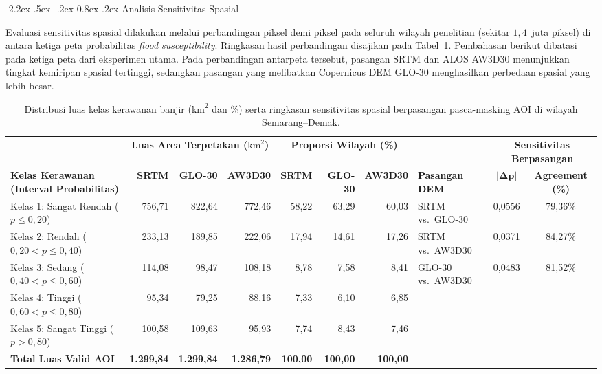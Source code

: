 \documentclass[12pt,a4paper]{article}
\makeatletter
\renewcommand\subsection{\@startsection{subsection}{2}{\z@}%
  {-2.2ex\@plus -.5ex \@minus -.2ex}%
  {0.8ex \@plus .2ex}%
  {\normalfont\normalsize\bfseries}}
\newenvironment{adjustbox}[1]{%
  \begin{lrbox}{\adjboxtemp}%
}{%
  \end{lrbox}%
  \ifdim\wd\adjboxtemp>\textwidth
    \resizebox{\textwidth}{!}{\usebox{\adjboxtemp}}%
  \else
    \usebox{\adjboxtemp}%
  \fi
}
\makeatother
\begin{document}
\subsection{Analisis Sensitivitas Spasial}

Evaluasi sensitivitas spasial dilakukan melalui perbandingan piksel demi
piksel pada seluruh wilayah penelitian (sekitar $1{,}4$~juta piksel) di
antara ketiga peta probabilitas \textit{flood susceptibility}. Ringkasan hasil
perbandingan disajikan pada Tabel~\ref{tab:sensitivitas}. Pembahasan
berikut dibatasi pada ketiga peta dari eksperimen utama. Pada perbandingan
antarpeta tersebut, pasangan SRTM
dan ALOS AW3D30 menunjukkan
tingkat kemiripan spasial tertinggi, sedangkan pasangan yang melibatkan
Copernicus DEM GLO-30 menghasilkan perbedaan spasial yang lebih besar.

\begin{table}[!htbp]
\small
\centering
\caption[Distribusi luas kelas kerawanan banjir dan sensitivitas spasial]{Distribusi luas kelas kerawanan banjir ($\text{km}^2$ dan \%) serta ringkasan sensitivitas spasial berpasangan pasca-masking AOI di wilayah Semarang--Demak.}
\label{tab:sensitivitas}
\begin{adjustbox}{max width=\textwidth}
\begin{tabular}{l rrr rrr l cc}
\toprule
& \multicolumn{3}{c}{\textbf{Luas Area Terpetakan ($\text{km}^2$)}} & \multicolumn{3}{c}{\textbf{Proporsi Wilayah (\%)}} & & \multicolumn{2}{c}{\textbf{Sensitivitas Berpasangan}} \\
\cmidrule(lr){2-4} \cmidrule(lr){5-7} \cmidrule(lr){9-10}
\textbf{Kelas Kerawanan (Interval Probabilitas)} & \textbf{SRTM} & \textbf{GLO-30} & \textbf{AW3D30} & \textbf{SRTM} & \textbf{GLO-30} & \textbf{AW3D30} & \textbf{Pasangan DEM} & $\boldsymbol{\overline{|\Delta p|}}$ & \textbf{Agreement (\%)} \\
\midrule
Kelas 1: Sangat Rendah ($p \le 0{,}20$) & 756,71 & 822,64 & 772,46 & 58,22 & 63,29 & 60,03 & SRTM vs.\ GLO-30 & 0,0556 & 79,36\% \\
Kelas 2: Rendah ($0{,}20 < p \le 0{,}40$) & 233,13 & 189,85 & 222,06 & 17,94 & 14,61 & 17,26 & SRTM vs.\ AW3D30 & 0,0371 & 84,27\% \\
Kelas 3: Sedang ($0{,}40 < p \le 0{,}60$) & 114,08 & 98,47 & 108,18 & 8,78 & 7,58 & 8,41 & GLO-30 vs.\ AW3D30 & 0,0483 & 81,52\% \\
Kelas 4: Tinggi ($0{,}60 < p \le 0{,}80$) & 95,34 & 79,25 & 88,16 & 7,33 & 6,10 & 6,85 & & & \\
Kelas 5: Sangat Tinggi ($p > 0{,}80$) & 100,58 & 109,63 & 95,93 & 7,74 & 8,43 & 7,46 & & & \\
\midrule
\textbf{Total Luas Valid AOI} & \textbf{1.299,84} & \textbf{1.299,84} & \textbf{1.286,79} & \textbf{100,00} & \textbf{100,00} & \textbf{100,00} & & & \\
\bottomrule
\end{tabular}
\end{adjustbox}
\end{table}
\end{document}
